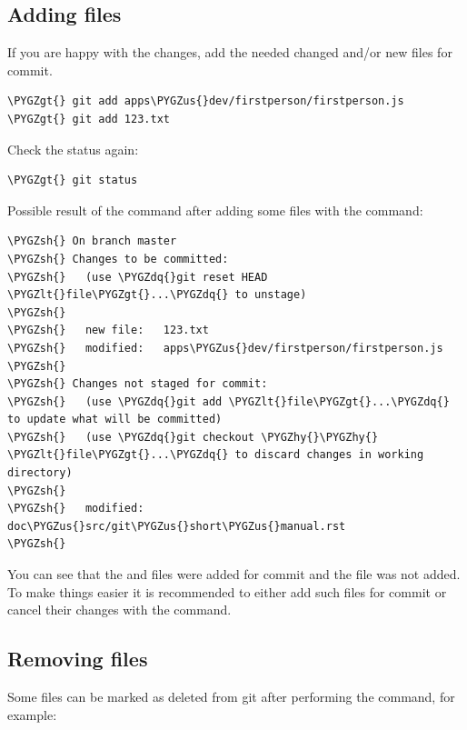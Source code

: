 \documentclass[a4paper,12pt,oneside]{sphinxmanual}
\def\PYGZus{\char`\_}
\def\PYGZlt{\char`\<}
\def\PYGZgt{\char`\>}
\def\PYGZsh{\char`\#}
\def\PYGZhy{\char`\-}
\def\PYGZdq{\char`\"}
\begin{document}
\subsection{Adding files}
\label{git_short_manual:id10}
If you are happy with the changes, add the needed changed and/or new files for commit.

\begin{Verbatim}[commandchars=\\\{\}]
\PYGZgt{} git add apps\PYGZus{}dev/firstperson/firstperson.js
\PYGZgt{} git add 123.txt
\end{Verbatim}

Check the status again:

\begin{Verbatim}[commandchars=\\\{\}]
\PYGZgt{} git status
\end{Verbatim}

Possible result of the  command after adding some files with the  command:

\begin{Verbatim}[commandchars=\\\{\}]
\PYGZsh{} On branch master
\PYGZsh{} Changes to be committed:
\PYGZsh{}   (use \PYGZdq{}git reset HEAD \PYGZlt{}file\PYGZgt{}...\PYGZdq{} to unstage)
\PYGZsh{}
\PYGZsh{}   new file:   123.txt
\PYGZsh{}   modified:   apps\PYGZus{}dev/firstperson/firstperson.js
\PYGZsh{}
\PYGZsh{} Changes not staged for commit:
\PYGZsh{}   (use \PYGZdq{}git add \PYGZlt{}file\PYGZgt{}...\PYGZdq{} to update what will be committed)
\PYGZsh{}   (use \PYGZdq{}git checkout \PYGZhy{}\PYGZhy{} \PYGZlt{}file\PYGZgt{}...\PYGZdq{} to discard changes in working directory)
\PYGZsh{}
\PYGZsh{}   modified:   doc\PYGZus{}src/git\PYGZus{}short\PYGZus{}manual.rst
\PYGZsh{}
\end{Verbatim}

You can see that the  and  files were added for commit and the  file was not added. To make things easier it is recommended to either add such files for commit or cancel their changes with the  command.


\subsection{Removing files}
\label{git_short_manual:id11}
Some files can be marked as deleted from git after performing the  command, for example:
\end{document}
